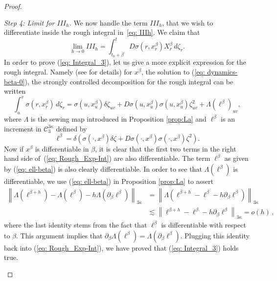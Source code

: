 \documentclass[12pt,reqno]{amsart}
\numberwithin{equation}{section}  %
\newcommand{\1}{{\bf 1}}
\newcommand{\2}{{\bf 2}}
\newcommand{\ka}{\kappa}
\newcommand{\lp}{\left(}
\newcommand{\rp}{\right)}
\theoremstyle{remark}
\theoremstyle{remark}
\begin{document}
\begin{proof}
\begin{enumerate}[wide, labelwidth=!, labelindent=0pt, label=\emph{(\roman*)}]
\smallskip
\noindent
\textit{Step 4: Limit for $III_{h}$.} 
We now handle the term $III_{h}$, that we wish to differentiate inside the rough integral in~\eqref{eq: IIIh}. We claim that 
\begin{equation}\label{eq: Integral_3}
    \lim_{h\to 0}III_{h}=\int_{t_{0}+\beta}^{t} D\sigma(r,x_{r}^{\beta})X_{r}^{\beta}\,d\zeta_{r} .
\end{equation}
In order to prove (\ref{eq: Integral_3}), let us give a more explicit expression for the rough integral. Namely (see \cite{gubinelli} for details) for $x^{\beta}$, the solution to (\ref{eq: dynamics-beta-0}), the strongly controlled decomposition for the rough integral can be written
\begin{equation}\label{eq: Rough_Exp-Int}
    \int_{u}^{v}\sigma(r,x_{r}^{\beta})\, d\zeta_{r}=\sigma(u,x_{u}^{\beta})\delta \zeta_{uv}+ D\sigma(u,x_{u}^{\beta})\sigma(u,x_{u}^{\beta})\zeta_{uv}^{2}+ \Lambda(\ell^{\beta})_{uv},
\end{equation}
where $\Lambda$ is the sewing map introduced in Proposition \ref{prop:La} and $\ell^{\beta}$ is an increment in $\mathcal{C}_{3}^{3\ka}$ defined by
\begin{equation}\label{eq: ell-beta}
    \ell^{\beta}=\delta\lp \sigma(\cdot,x^{\beta})\delta \zeta +D\sigma(\cdot,x^{\beta})\sigma(\cdot,x^{\beta})\zeta^{2}\rp.
\end{equation}
Now if $x^{\beta}$ is differentiable in $\beta$, it is clear that the first two terms in the right hand side of~(\ref{eq: Rough_Exp-Int}) are also differentiable. The term $\ell^{\beta}$ as given by (\ref{eq: ell-beta}) is also clearly differentiable. In order to see that $\Lambda(\ell^{\beta})$ is differentiable, we use 
(\ref{eq: ell-beta}) in Proposition \ref{prop:La} to assert
\begin{align*}
   \left\| \Lambda(\ell^{\beta+h})- \Lambda(\ell^{\beta})-h\Lambda(\partial_{\beta}\ell^{\beta})\right\|_{3\kappa}
   &=
   \left\| \Lambda(\ell^{\beta + h} -\ell^{\beta}-h\partial_{\beta}\ell^{\beta}) \right\|_{3\kappa} \\ 
   &\lesssim 
   \left\|\ell^{\beta+h}-\ell^{\beta}-h\partial_{\beta}\ell^{\beta}\right\|_{3\kappa}=o(h) \, ,
\end{align*}
where the last identity stems from the fact that $\ell^{\beta}$ is differentiable with respect to $\beta$. This argument implies that $\partial_{\beta}\Lambda(\ell^{\beta})=\Lambda(\partial_{\beta}\ell^{\beta})$. Plugging this identity back into (\ref{eq: Rough_Exp-Int}), we have proved that (\ref{eq: Integral_3}) holds true.


\end{enumerate}
\end{proof}
\end{document}
